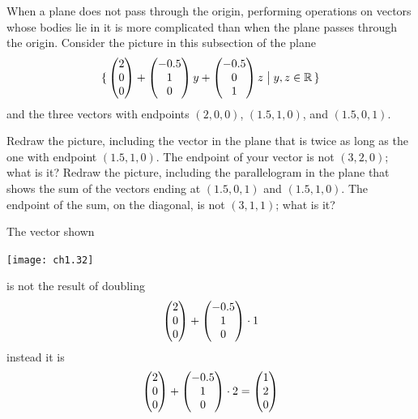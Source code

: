 \begin{exercises}
    When a plane does not pass through the origin, performing
    operations on vectors whose bodies lie in it
    is more complicated than when
    the plane passes through the origin.
    Consider the picture in this subsection of the plane 
    \begin{equation*}
      \mbox{$\{\,\begin{pmatrix} 2 \\ 0 \\ 0 \end{pmatrix}
            +\begin{pmatrix} -0.5 \\ 1 \\ 0 \end{pmatrix} y
            +\begin{pmatrix} -0.5 \\ 0 \\ 1 \end{pmatrix} z
            \bigm| y,z\in\mathbb{R}\,\}$}
    \end{equation*}
    and the three vectors with endpoints
    $(2,0,0)$, $(1.5,1,0)$, and $(1.5,0,1)$.
    \begin{exparts}
      \partsitem Redraw the picture, including the vector 
        in the plane that is twice as long as the one with
        endpoint $(1.5,1,0)$.
        The endpoint of your vector is not $(3,2,0)$; what is it?
      \partsitem Redraw the picture, including the parallelogram 
        in the plane that shows the sum of the vectors 
        ending at $(1.5,0,1)$ and $(1.5,1,0)$.
        The endpoint of the sum, on the diagonal, is not $(3,1,1)$; what is it?
    \end{exparts}
    \begin{answer}
      \begin{exparts}
        \partsitem The vector shown
          \begin{center}
            \texttt{[image: ch1.32]}
          \end{center}
          is not the result of doubling
          \begin{equation*}
            \begin{pmatrix} 2 \\ 0 \\ 0 \end{pmatrix}
              +\begin{pmatrix} -0.5 \\ 1 \\ 0 \end{pmatrix}\cdot 1
          \end{equation*}
          instead it is 
          \begin{equation*}
            \begin{pmatrix} 2 \\ 0 \\ 0 \end{pmatrix}
              +\begin{pmatrix} -0.5 \\ 1 \\ 0 \end{pmatrix}\cdot 2
            =\begin{pmatrix} 1 \\ 2 \\ 0 \end{pmatrix}
          \end{equation*}

\end{exparts}
\end{answer}
\end{exercises}
